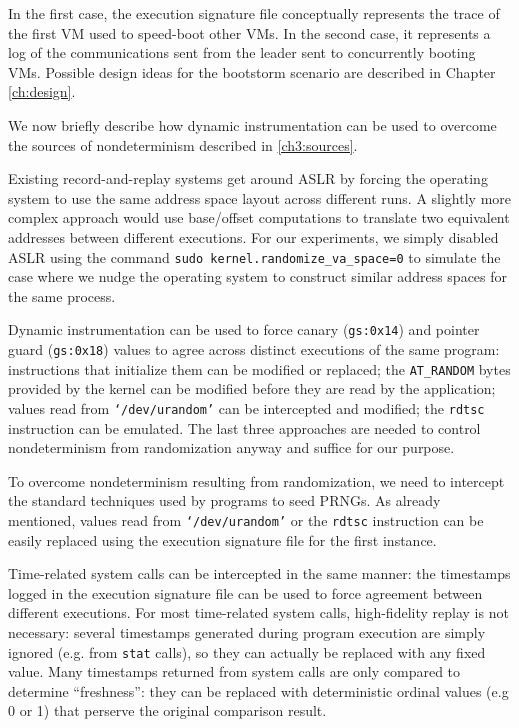 In the first case, the execution signature file
conceptually represents the trace of the first VM used to speed-boot
other VMs. In the second case, it represents a log of the communications 
sent from the leader sent to concurrently booting VMs. Possible
design ideas for the bootstorm scenario are described 
in Chapter \ref{ch:design}.

We now briefly describe how dynamic instrumentation can be used to overcome
the sources of nondeterminism described in \ref{ch3:sources}. \newline

 \newline
Existing record-and-replay systems get around ASLR by
forcing the operating system to use the same address space layout across
different runs. A slightly more complex approach 
would use base/offset computations to translate two equivalent 
addresses between different executions. 
For our experiments, we simply disabled ASLR using the command
\texttt {sudo kernel.randomize\_va\_space=0} to simulate the 
case where we nudge the operating system to construct
similar address spaces for the same process. \newline

 \newline
Dynamic instrumentation can be used to force canary (\texttt{gs:0x14})
and pointer guard (\texttt{gs:0x18}) values
to agree across distinct executions of the same program:
instructions that initialize them can be
modified or replaced; the \texttt{AT\_RANDOM} bytes 
provided by the kernel can be
modified before they are read by the application; 
values read from \texttt{`/dev/urandom'} can be 
intercepted and modified; the \texttt{rdtsc} instruction can be emulated.
The last three approaches are needed to control nondeterminism
from randomization anyway and suffice for our purpose. \newline

 \newline
To overcome nondeterminism resulting from randomization,
we need to intercept the standard techniques
used by programs to seed PRNGs.
As already mentioned, values read from \texttt{`/dev/urandom'}
or the \texttt{rdtsc} instruction can be easily replaced
using the execution signature file for the first instance.

Time-related system calls can
be intercepted in the same manner:
the timestamps logged
in the execution signature file
can be used to force agreement
between different executions.
For most time-related system calls,
high-fidelity replay is not necessary:
several timestamps generated
during program execution are simply ignored
(e.g. from \texttt{stat} calls),
so they can actually be replaced with any 
fixed value. Many timestamps
returned from system calls are only compared to
determine ``freshness'': they
can be replaced with deterministic ordinal values (e.g 0 or 1) that 
perserve the original comparison result.

